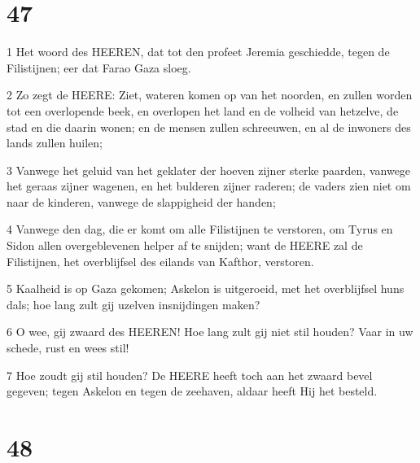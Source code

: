 \chapter{47}

\par 1 Het woord des HEEREN, dat tot den profeet Jeremia geschiedde, tegen de Filistijnen; eer dat Farao Gaza sloeg.
\par 2 Zo zegt de HEERE: Ziet, wateren komen op van het noorden, en zullen worden tot een overlopende beek, en overlopen het land en de volheid van hetzelve, de stad en die daarin wonen; en de mensen zullen schreeuwen, en al de inwoners des lands zullen huilen;
\par 3 Vanwege het geluid van het geklater der hoeven zijner sterke paarden, vanwege het geraas zijner wagenen, en het bulderen zijner raderen; de vaders zien niet om naar de kinderen, vanwege de slappigheid der handen;
\par 4 Vanwege den dag, die er komt om alle Filistijnen te verstoren, om Tyrus en Sidon allen overgeblevenen helper af te snijden; want de HEERE zal de Filistijnen, het overblijfsel des eilands van Kafthor, verstoren.
\par 5 Kaalheid is op Gaza gekomen; Askelon is uitgeroeid, met het overblijfsel huns dals; hoe lang zult gij uzelven insnijdingen maken?
\par 6 O wee, gij zwaard des HEEREN! Hoe lang zult gij niet stil houden? Vaar in uw schede, rust en wees stil!
\par 7 Hoe zoudt gij stil houden? De HEERE heeft toch aan het zwaard bevel gegeven; tegen Askelon en tegen de zeehaven, aldaar heeft Hij het besteld.

\chapter{48}

